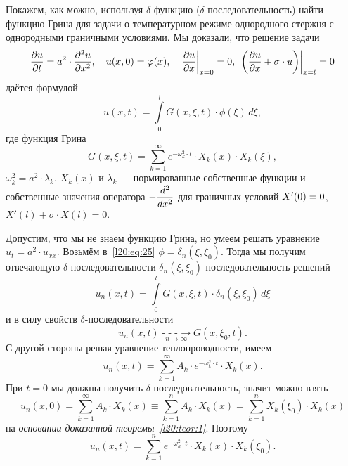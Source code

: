Покажем, как можно, используя $\delta$-функцию ($\delta$-последовательность) найти функцию Грина для задачи о температурном режиме однородного стержня с однородными граничными условиями. Мы доказали, что решение задачи 
\begin{equation*}
	\pder{u}{t}=a^2\cdot\pdder{u}{x},\quad u(x,0)=\phi(x),\quad\left.\pder{u}{x}\right|_{x=0}=0,\ \left.\left(\pder{u}{x}+\sigma\cdot u\right)\right|_{x=l}=0
\end{equation*}
даётся формулой
\begin{equation}\label{l20:eq:25}
	u(x,t)=\int\limits_0^l G(x,\xi,t)\cdot\phi(\xi)\,d\xi,
\end{equation}
где функция Грина 
\begin{equation*}
	G(x,\xi,t)=\sum\limits_{k=1}^{\infty}e^{-\omega_k^2\cdot t}\cdot X_k(x)\cdot X_k(\xi),
\end{equation*}
$\omega_k^2=a^2\cdot\lambda_k$, $X_k(x)$ и $\lambda_k$ --- нормированные собственные функции и собственные значения оператора $\displaystyle-\frac{d^2}{dx^2}$ для граничных условий $X'(0)\?=0$, $X'(l)+\sigma\cdot X(l)=0$.

Допустим, что мы не знаем функцию Грина, но умеем решать уравнение $u_t=a^2\cdot u_{xx}$. Возьмём в~\eqref{l20:eq:25} $\phi=\delta_n(\xi,\xi_0)$. Тогда мы получим отвечающую $\delta$-последовательности $\delta_n(\xi,\xi_0)$ последовательность решений 
\begin{equation*}
	u_n(x,t)=\int\limits_0^l G(x,\xi,t)\cdot\delta_n(\xi,\xi_0)\,d\xi
\end{equation*} 
и в силу свойств $\delta$-последовательности
\begin{equation*}
	u_n(x,t)\mathop{-\!\!\!-\!\!\!-\!\!\!\longrightarrow}\limits_{n\to\infty}G(x,\xi_0,t).
\end{equation*}
С другой стороны решая уравнение теплопроводности, имеем
\begin{equation*}
	u_n(x,t)=\sum\limits_{k=1}^{\infty}A_k\cdot e^{-\omega_k^2\cdot t}\cdot X_k(x).
\end{equation*}
При $t=0$ мы должны получить $\delta$-последовательность, значит можно взять
\begin{equation*}
	u_n(x,0)=\sum\limits_{k=1}^{\infty}A_k\cdot X_k(x)\equiv\sum\limits_{k=1}^{n}A_k\cdot X_k(x)=\sum\limits_{k=1}^{n}X_k(\xi_0)\cdot X_k(x)
\end{equation*}
на \emph{основании доказанной теоремы~\ref{l20:teor:1}}. Поэтому 
\begin{equation*}
	u_n(x,t)=\sum\limits_{k=1}^{n}e^{-\omega_k^2\cdot t}\cdot X_k(x)\cdot X_k(\xi_0).
\end{equation*} 

